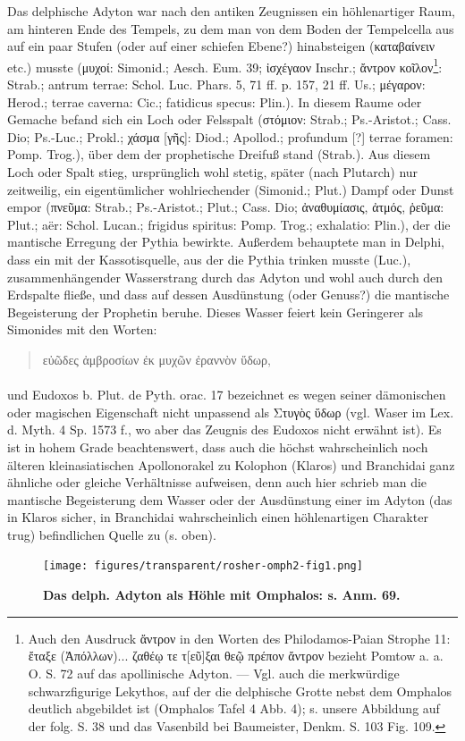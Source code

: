 \documentclass[a4paper, 11pt, oneside]{article}
\begin{document}
Das delphische Adyton war nach den antiken Zeugnissen ein höhlenartiger Raum, am hinteren Ende des Tempels, zu dem man von dem Boden der Tempelcella aus auf ein paar Stufen (oder auf einer schiefen Ebene?) hinabsteigen (καταβαίνειν etc.) musste (μυχοί: Simonid.; Aesch. Eum. 39; ἰσχέγαον Inschr.; ἄντρον κοῖλον\footnote{Auch den Ausdruck ἄντρον in den Worten des Philodamos-Paian Strophe 11: ἔταξε (Ἀπόλλων)... ζαθέῳ τε τ[εῦ]ξαι θεῷ πρέπον ἄντρον bezieht Pomtow a. a. O. S. 72 auf das apollinische Adyton. --- Vgl. auch die merkwürdige schwarzfigurige Lekythos, auf der die delphische Grotte nebst dem Omphalos deutlich abgebildet ist (Omphalos Tafel 4 Abb. 4); s. unsere Abbildung auf der folg. S. 38 und das Vasenbild bei Baumeister, Denkm. S. 103 Fig. 109.}: Strab.; antrum terrae: Schol. Luc. Phars. 5, 71 ff. p. 157, 21 ff. Us.; μέγαρον: Herod.; terrae caverna: Cic.; fatidicus specus: Plin.). In diesem Raume oder Gemache befand sich ein Loch oder Felsspalt (στόμιον: Strab.; Ps.-Aristot.; Cass. Dio; Ps.-Luc.; Prokl.; χάσμα [γῆς]: Diod.; Apollod.; profundum [?] terrae foramen: Pomp. Trog.), über dem der prophetische Dreifuß stand (Strab.). Aus diesem Loch oder Spalt stieg, ursprünglich wohl stetig, später (nach Plutarch) nur zeitweilig, ein eigentümlicher wohlriechender (Simonid.; Plut.) Dampf oder Dunst empor (πνεῦμα: Strab.; Ps.-Aristot.; Plut.; Cass. Dio; ἀναθυμίασις, ἀτμός, ῥεῦμα: Plut.; aër: Schol. Lucan.; frigidus spiritus: Pomp. Trog.; exhalatio: Plin.), der die mantische Erregung der Pythia bewirkte. Außerdem behauptete man in Delphi, dass ein mit der Kassotisquelle, aus der die Pythia trinken musste (Luc.), zusammenhängender Wasserstrang durch das Adyton und wohl auch durch den Erdspalte fließe, und dass auf dessen Ausdünstung (oder Genuss?) die mantische Begeisterung der Prophetin beruhe. Dieses Wasser feiert kein Geringerer als Simonides mit den Worten:
\begin{quotation}
εὐῶδες ἀμβροσίων ἐκ μυχῶν ἐραννὸν ὕδωρ,
\end{quotation}
\paragraph{}
und Eudoxos b. Plut. de Pyth. orac. 17 bezeichnet es wegen seiner dämonischen oder magischen Eigenschaft nicht unpassend als Στυγὸς ὕδωρ (vgl. Waser im Lex. d. Myth. 4 Sp. 1573 f., wo aber das Zeugnis des Eudoxos nicht erwähnt ist). Es ist in hohem Grade beachtenswert, dass auch die höchst wahrscheinlich noch älteren kleinasiatischen Apollonorakel zu Kolophon (Klaros) und Branchidai ganz ähnliche oder gleiche Verhältnisse aufweisen, denn auch hier schrieb man die mantische Begeisterung dem Wasser oder der Ausdünstung einer im Adyton (das in Klaros sicher, in Branchidai wahrscheinlich einen höhlenartigen Charakter trug) befindlichen Quelle zu (s. oben).
\begin{figure}[H]
\centering
\texttt{[image: figures/transparent/rosher-omph2-fig1.png]}
\caption{\bfseries \bfseries Das delph. Adyton als Höhle mit Omphalos: s. Anm. 69.}
\end{figure}
\end{document}
